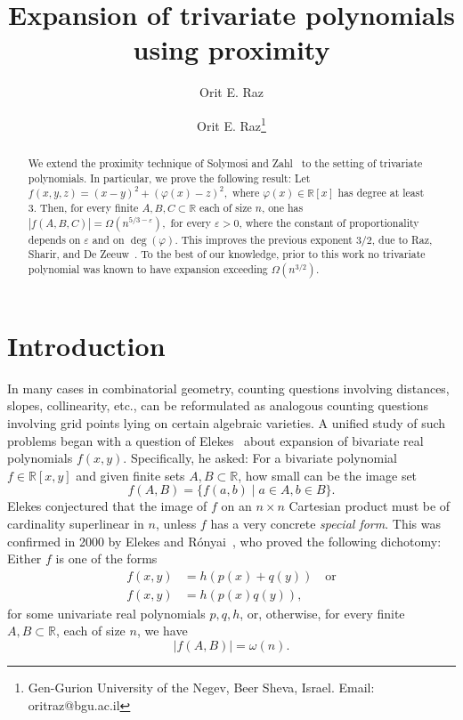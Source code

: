 \documentclass[letterpaper, reqno,11pt]{article}
\newcommand{\RR}{\mathbb{R}}
\newcommand{\eps}{\varepsilon}
\theoremstyle{definition}
\theoremstyle{remark}
\begin{document}
\title{Expansion of trivariate polynomials using proximity}
\author{Orit E. Raz}
\author{
Orit E. Raz\thanks{Gen-Gurion University of the Negev, Beer Sheva, Israel. Email: oritraz@bgu.ac.il}}
\maketitle
\begin{abstract}
We extend the proximity technique of Solymosi and Zahl~\cite{SolZah} to the setting of trivariate polynomials.
In particular, we prove the following result: Let $f(x,y,z)=(x-y)^2+(\varphi(x)-z)^2,
$
where $\varphi(x)\in \RR[x]$ has degree at least 3. Then, for every finite $A,B,C\subset \RR$ each of size $n$, one has
$
|f(A,B,C)|=\Omega(n^{5/3-\eps}),
$
for every $\eps>0$, where the constant of proportionality depends on $\eps$ and on $\deg(\varphi)$. 
This improves the previous exponent $3/2$, due to Raz, Sharir, and De Zeeuw~\cite{RazShaDeZee4D}.
To the best of our knowledge, prior to this work no trivariate polynomial was known to have expansion exceeding $\Omega(n^{3/2})$.
\end{abstract}
\vspace{1ex}

\section{Introduction}
In many cases in combinatorial geometry, counting questions involving distances, slopes, collinearity, etc., can be reformulated as analogous counting questions involving grid points lying on certain algebraic varieties. A unified study of such problems began with a question of Elekes~\cite{Ele} about expansion of bivariate real polynomials $f(x,y)$. 
Specifically, he asked: For a bivariate polynomial $f\in \RR[x,y]$ and given finite sets $A,B\subset \RR$, how small can be the image set
$$
f(A,B)=\{f(a,b)\mid a\in A, b\in B\}.
$$
Elekes conjectured that the image of $f$ on an $n\times n$ Cartesian product must be of cardinality superlinear in $n$, unless $f$ has a very concrete {\it special form}. This was confirmed in 2000 by Elekes and R\'onyai~\cite{ER00}, who proved the following dichotomy: Either $f$ is one of the forms
\begin{align}
f(x,y)&=h(p(x)+q(y))\quad\text{or}\nonumber\\f(x,y)&=h(p(x)q(y)),\label{specialbivariate}
\end{align} for some univariate real polynomials $p,q,h$, or, otherwise, for every finite $A,B\subset \RR$, each of size $n$, we have
\begin{equation}\label{eq:ER}
|f(A,B)|=\omega(n).
\end{equation}
\end{document}
